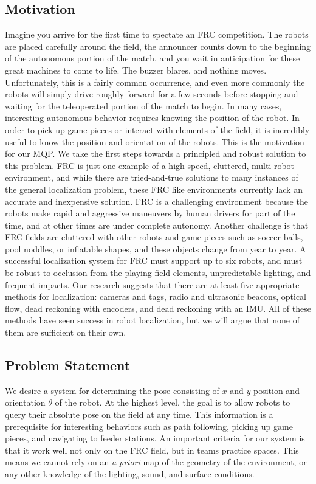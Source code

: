 \documentclass{article}
\begin{document}
  \subsection{Motivation}

    Imagine you arrive for the first time to spectate an FRC competition. The robots are placed carefully around the field, the announcer counts down to the beginning of the autonomous portion of the match, and you wait in anticipation for these great machines to come to life. The buzzer blares, and nothing moves. Unfortunately, this is a fairly common occurrence, and even more commonly the robots will simply drive roughly forward for a few seconds before stopping and waiting for the teleoperated portion of the match to begin. In many cases, interesting autonomous behavior requires knowing the position of the robot. In order to pick up game pieces or interact with elements of the field, it is incredibly useful to know the position and orientation of the robots. This is the motivation for our MQP. We take the first steps towards a principled and robust solution to this problem. FRC is just one example of a high-speed, cluttered, multi-robot environment, and while there are tried-and-true solutions to many instances of the general localization problem, these FRC like environments currently lack an accurate and inexpensive solution. FRC is a challenging environment because the robots make rapid and aggressive maneuvers by human drivers for part of the time, and at other times are under complete autonomy. Another challenge is that FRC fields are cluttered with other robots and game pieces such as soccer balls, pool noddles, or inflatable shapes, and these objects change from year to year. A successful localization system for FRC must support up to six robots, and must be robust to occlusion from the playing field elements, unpredictable lighting, and frequent impacts. Our research suggests that there are at least five appropriate methods for localization: cameras and tags, radio and ultrasonic beacons, optical flow, dead reckoning with encoders, and dead reckoning with an IMU. All of these methods have seen success in robot localization, but we will argue that none of them are sufficient on their own.

  \subsection{Problem Statement}

    We desire a system for determining the pose consisting of $x$ and $y$ position and orientation $\theta$ of the robot. At the highest level, the goal is to allow robots to query their absolute pose on the field at any time. This information is a prerequisite for interesting behaviors such as path following, picking up game pieces, and navigating to feeder stations. An important criteria for our system is that it work well not only on the FRC field, but in teams practice spaces. This means we cannot rely on an \textit{a priori} map of the geometry of the environment, or any other knowledge of the lighting, sound, and surface conditions.
\end{document}
